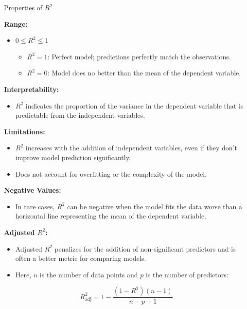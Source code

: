\begin{frame}[allowframebreaks]{Properties of $R^2$}

\textbf{Range:}
\begin{itemize}
    \item $0 \leq R^2 \leq 1$
    \begin{itemize}
        \item $R^2 = 1$: Perfect model; predictions perfectly match the observations.
        \item $R^2 = 0$: Model does no better than the mean of the dependent variable.
    \end{itemize}
\end{itemize}

\textbf{Interpretability:}
\begin{itemize}
    \item $R^2$ indicates the proportion of the variance in the dependent variable that is predictable from the independent variables.
\end{itemize}

\textbf{Limitations:}
\begin{itemize}
    \item $R^2$ increases with the addition of independent variables, even if they don’t improve model prediction significantly.
    \item Does not account for overfitting or the complexity of the model.
\end{itemize}

\textbf{Negative Values:}
\begin{itemize}
    \item In rare cases, $R^2$ can be negative when the model fits the data worse than a horizontal line representing the mean of the dependent variable.
\end{itemize}

\textbf{Adjusted $R^2$:}
\begin{itemize}
    \item Adjusted $R^2$ penalizes for the addition of non-significant predictors and is often a better metric for comparing models.
    \item Here, $n$ is the number of data points and $p$ is the number of predictors:
\end{itemize}

\begin{equation*}
    R^2_{\text{adj}} = 1 - \frac{(1 - R^2)(n - 1)}{n - p - 1}
\end{equation*}

\end{frame}



